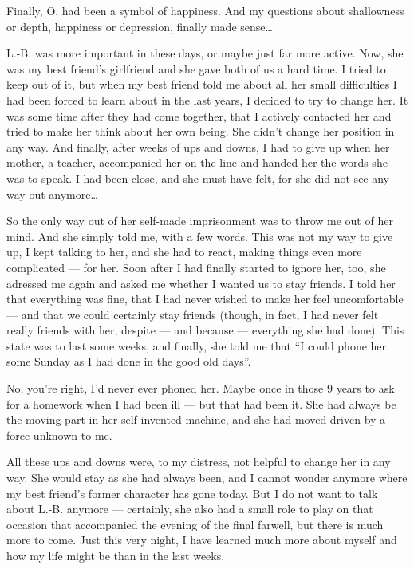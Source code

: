 Finally, O. had been a symbol of happiness. And my questions about shallowness or depth, happiness or depression, finally made sense\dots{}

L.-B. was more important in these days, or maybe just far more active. Now, she was my best friend's girlfriend and she gave both of us a hard time. I tried to keep out of it, but when my best friend told me about all her small difficulties I had been forced to learn about in the last years, I decided to try to change her. It was some time after they had come together, that I actively contacted her and tried to make her think about her own being. She didn't change her position in any way. And finally, after weeks of ups and downs, I had to give up when her mother, a teacher, accompanied her on the line and handed her the words she was to speak. I had been close, and she must have felt, for she did not see any way out anymore\dots{}

So the only way out of her self-made imprisonment was to throw me out of her mind. And she simply told me, with a few words. This was not my way to give up, I kept talking to her, and she had to react, making things even more complicated --- for her. Soon after I had finally started to ignore her, too, she adressed me again and asked me whether I wanted us to stay friends. I told her that everything was fine, that I had never wished to make her feel uncomfortable --- and that we could certainly stay friends (though, in fact, I had never felt really friends with her, despite --- and because --- everything she had done). 
This state was to last some weeks, and finally, she told me that \enquote{I could phone her some Sunday as I had done in the good old days}.

No, you're right, I'd never ever phoned her. Maybe once in those 9 years to ask for a homework when I had been ill --- but that had been it. She had always be the moving part in her self-invented machine, and she had moved driven by a force unknown to me.

All these ups and downs were, to my distress, not helpful to change her in any way. She would stay as she had always been, and I cannot wonder anymore where my best friend's former character has gone today. 
But I do not want to talk about L.-B. anymore --- certainly, she also had a small role to play on that occasion that accompanied the evening of the final farwell, but there is much more to come. Just this very night, I have learned much more about myself and how my life might be than in the last weeks.


